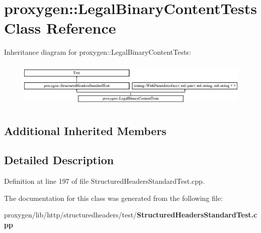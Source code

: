 \section{proxygen\+:\+:Legal\+Binary\+Content\+Tests Class Reference}
\label{classproxygen_1_1LegalBinaryContentTests}
Inheritance diagram for proxygen\+:\+:Legal\+Binary\+Content\+Tests\+:\begin{figure}[H]
\begin{center}
\leavevmode
\includegraphics[height=2.216359cm]{classproxygen_1_1LegalBinaryContentTests}
\end{center}
\end{figure}
\subsection*{Additional Inherited Members}


\subsection{Detailed Description}


Definition at line 197 of file Structured\+Headers\+Standard\+Test.\+cpp.



The documentation for this class was generated from the following file\+:\begin{DoxyCompactItemize}
\item 
proxygen/lib/http/structuredheaders/test/{\bf Structured\+Headers\+Standard\+Test.\+cpp}\end{DoxyCompactItemize}
